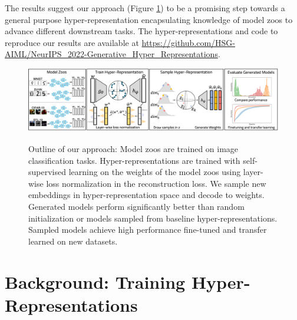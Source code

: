 \documentclass{article}
\begin{document}
The results suggest our approach (Figure \ref{fig:scheme}) to be a promising step towards a general purpose hyper-representation encapsulating knowledge of model zoos to advance different downstream tasks.
The hyper-representations and code to reproduce our results are available at 
\url{https://github.com/HSG-AIML/NeurIPS_2022-Generative_Hyper_Representations}.


\begin{figure}[t]
\begin{minipage}[t]{0.98\textwidth}
\begin{center}
\includegraphics[trim=0in 0in 0in 0in, clip, width=1.0\linewidth]{figures/schematic_v3.png}
\vskip -0.1in
\caption{\small Outline of our approach: Model zoos are trained on image classification tasks. Hyper-representations are trained with self-supervised learning on the weights of the model zoos using layer-wise loss normalization in the reconstruction loss. 
We sample new embeddings in hyper-representation space and decode to weights. 
Generated models perform significantly better than random initialization or models sampled from baseline hyper-representations. 
Sampled models achieve high performance fine-tuned and transfer learned on new datasets.
}
\vskip -0.5cm
\label{fig:scheme}    
\end{center}
\end{minipage}
\end{figure}

\vspace{-5pt}
\section{Background: Training Hyper-Representations}
\label{sec:training}
\vspace{-5pt}
\end{document}
